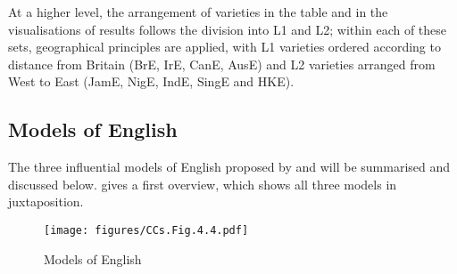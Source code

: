 At a higher level, the arrangement of varieties in the table and in the visualisations of results follows the division into L1 and L2; within each of these sets, geographical principles are applied, with L1 varieties ordered according to distance from Britain (BrE, IrE, CanE, AusE) and L2 varieties arranged from West to East (JamE, NigE, IndE, SingE and HKE).

\subsection{\label{bkm:Ref497158185}Models of English}\label{sec:4.3.2}

The three influential models of English proposed by \citet{Kachru1985,Kachru1988,McArthur1987} and \citet{Schneider2003, Schneider2007} will be summarised and discussed below.  gives a first overview, which shows all three models in juxtaposition.

\begin{figure}
\texttt{[image: figures/CCs.Fig.4.4.pdf]}
\caption{\label{bkm:Ref475024343}\label{bkm:Ref497947644}\label{fig:4.4}Models of English}
\end{figure}

